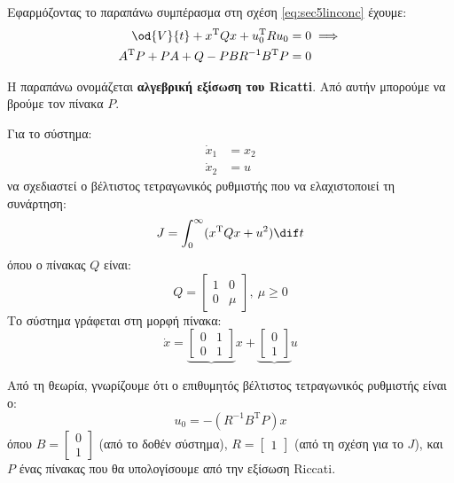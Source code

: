 \documentclass[11pt,a4paper,notitlepage,fleqn]{article}
\begin{document}
Εφαρμόζοντας το παραπάνω συμπέρασμα στη σχέση \eqref{eq:sec5linconc} έχουμε:
\begin{align*}
	\od{V}{t} + x^{\mathrm T}Qx + u_0^{\mathrm T} R u_0 &= 0 \implies \\
	A^{\mathrm T}P + PA + Q - PBR^{-1}B^{\mathrm T}P &= 0
\end{align*}

Η παραπάνω ονομάζεται \textbf{αλγεβρική εξίσωση του Ricatti}. Από αυτήν
μπορούμε να βρούμε τον πίνακα \( P \).

\begin{exercise}
	Για το σύστημα:
	\begin{align*}
		\dot x_1 &= x_2 \\
		\dot x_2 &= u
	\end{align*}
	να σχεδιαστεί ο βέλτιστος τετραγωνικός ρυθμιστής που να ελαχιστοποιεί
	τη συνάρτηση:
	\[
	J = \int_{0 }^{\infty} (x^{\mathrm T} Q x +u^2)\dif t
	\]
	όπου ο πίνακας \( Q \) είναι:
	\[
	Q = \left[\begin{matrix}
	1 & 0 \\ 0 & \mu
	\end{matrix}\right], \ \mu \geq 0
	\]
	\tcblower
	Το σύστημα γράφεται στη μορφή πίνακα:
	\[
	\dot x = \underbrace{\left[\begin{matrix}
		0 & 1 \\ 0 & 1
		\end{matrix}\right]}x + \underbrace{\left[\begin{matrix}
		0 \\ 1
		\end{matrix}\right]}u
	\]

	Από τη θεωρία, γνωρίζουμε ότι ο επιθυμητός βέλτιστος τετραγωνικός
	ρυθμιστής είναι ο:
	\[
	u_0 = -(R^{-1}B^{\mathrm T}P)x
	\]
	όπου \( B = \left[\begin{matrix}
	0 \\ 1
	\end{matrix}\right] \) (από το δοθέν σύστημα), \( R = \left[\begin{matrix}
	1
	\end{matrix}\right] \) (από τη σχέση για το \( J \)), και \( P \)
	ένας πίνακας που θα υπολογίσουμε από την εξίσωση Riccati.


\end{exercise}
\end{document}
